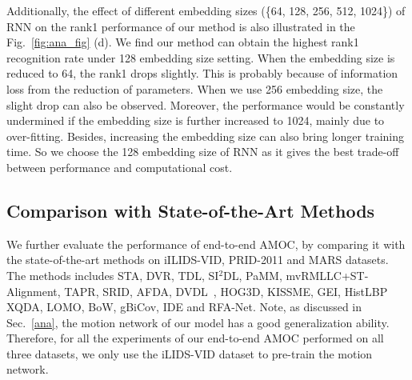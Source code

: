 \documentclass[journal]{IEEEtran}
\begin{document}
Additionally, the effect of different embedding sizes (\{64, 128, 256, 512, 1024\}) of RNN on the rank1 performance of our method  is also illustrated in the Fig.~\ref{fig:ana_fig} (d). We find our method can obtain the highest rank1 recognition rate under 128 embedding size setting. When the embedding size is reduced to 64, the rank1 drops slightly. This is probably because of information loss from the reduction of parameters. When we use 256 embedding size, the slight drop can also be observed. Moreover, the performance would be constantly undermined if the embedding size is further increased to 1024, mainly due to over-fitting. Besides, increasing the embedding size can also bring longer training time. So we choose the 128 embedding size of RNN as it gives the best trade-off between performance and computational cost.   


 \subsection{Comparison with State-of-the-Art Methods}
 We further evaluate the performance of end-to-end AMOC, by comparing it with the state-of-the-art methods on iILIDS-VID, PRID-2011 and MARS datasets. The methods includes STA\cite{liu2015spatio}, DVR\cite{wang2016person}, TDL\cite{you2016top}, SI$^{2}$DL\cite{zhu2016video}, PaMM\cite{cho2016improving}, mvRMLLC+ST-Alignment\cite{chen2015person}, TAPR\cite{gao2016temporally}, SRID\cite{karanam2015sparse}, AFDA\cite{Li2015Multi}, DVDL~\cite{Karanam2015Person}, HOG3D\cite{Kl2008A}, KISSME\cite{K2012Large}, GEI\cite{Han2005Individual}, HistLBP\cite{xiong2014person} XQDA\cite{liao2015person}, LOMO\cite{liao2015person}, BoW\cite{zheng2015scalable}, gBiCov\cite{ma2014covariance}, IDE\cite{zheng2016person} and RFA-Net\cite{yan2016person}. Note, as discussed in Sec.~\ref{ana}, the motion network of our model has a good generalization ability. Therefore, for all the experiments of our end-to-end AMOC performed on all three datasets, we only use the  iLIDS-VID dataset to pre-train the motion network. 
 
\end{document}
